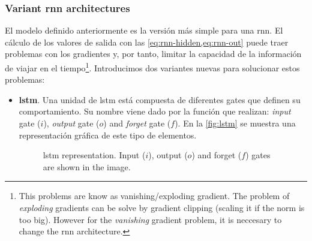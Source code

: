 \subsubsection{Variant \gls*{rnn} architectures}
El modelo definido anteriormente es la versión más simple para una
\gls{rnn}. El cálculo de los valores de salida con las
\vref{eq:rnn-hidden,eq:rnn-out} puede traer problemas con los gradientes y, por
tanto, limitar la capacidad de la información de viajar en el
tiempo\footnote{This problems are know as vanishing/exploding gradient. The
  problem of \emph{exploding} gradients can be solve by gradient clipping
  (scaling it if the norm is too big). However for the \emph{vanishing}
  gradient problem, it is neccesary to change the \gls{rnn}
  architecture.}. Introducimos dos variantes nuevas para solucionar estos
problemas:
\begin{itemize}
  \item \textbf{\gls*{lstm}}. Una unidad de \gls{lstm} está compuesta de
  diferentes gates que definen su comportamiento. Su nombre viene dado por la
  función que realizan: \emph{input} gate (\(i\)), \emph{output} gate (\(o\))
  and \emph{forget} gate (\(f\)). En la \vref{fig:lstm} se muestra una
  representación gráfica de este tipo de elementos.
  \begin{figure}[ht]
    \centering
    
    \caption[\acl*{lstm}]{\acf{lstm} representation. Input (\(i\)), output
      (\(o\)) and forget (\(f\)) gates are shown in the image.}
    \label{fig:lstm}
  \end{figure}


\end{itemize}
